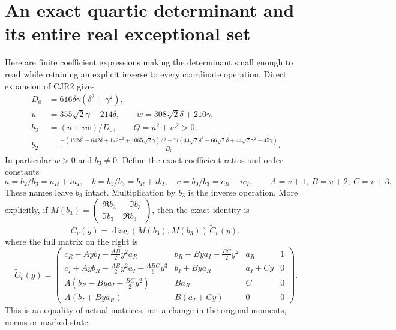 \section{An exact quartic determinant and its entire real exceptional set}
Here are finite coefficient expressions making the determinant small
enough to read while retaining an explicit inverse to every coordinate
operation. Direct expansion of CJR2 gives
\[
 \begin{split}
 D_0&=616\delta\gamma(\delta^2+\gamma^2),\\
 u&=355\sqrt2\gamma-214\delta,
 \qquad w=308\sqrt2\delta+210\gamma,\\
 b_3&=(u+iw)/D_0,\qquad Q=u^2+w^2>0,\\
 b_2&=\frac{-(172\delta^2-642\delta+172\gamma^2+
                   1065\sqrt2\gamma)/2
       +7i(44\sqrt2\delta^2-66\sqrt2\delta+
                    44\sqrt2\gamma^2-45\gamma)}{D_0}.
 \end{split}\tag{CJR6}
\]
In particular $w>0$ and $b_3\ne0$. Define the exact coefficient
ratios and order constants
\[
 a=b_2/b_3=a_R+ia_I,\quad b=b_1/b_3=b_R+ib_I,
 \quad c=b_0/b_3=c_R+ic_I,
 \qquad A=v+1,\ B=v+2,\ C=v+3.
 \tag{CJR7}
\]
These names leave $b_3$ intact. Multiplication by $b_3$ is the
inverse operation. More explicitly, if
$M(b_3)=\left(\begin{smallmatrix}\Re b_3&-\Im b_3\\
\Im b_3&\Re b_3\end{smallmatrix}\right)$, then the exact identity is
\[
 C_v(y)=\operatorname{diag}(M(b_3),M(b_3))\,\widetilde C_v(y),
 \tag{CJR8}
\]
where the full matrix on the right is
\[
\widetilde C_v(y)=
\begin{pmatrix}
 c_R-Ayb_I-\frac{AB}{2}y^2a_R&
 b_R-Bya_I-\frac{BC}{2}y^2&a_R&1\\
 c_I+Ayb_R-\frac{AB}{2}y^2a_I-\frac{ABC}{6}y^3&
 b_I+Bya_R&a_I+Cy&0\\
 A(b_R-Bya_I-\frac{BC}{2}y^2)&Ba_R&C&0\\
 A(b_I+Bya_R)&B(a_I+Cy)&0&0
\end{pmatrix}.
\tag{CJR9}
\]
This is an equality of actual matrices, not a change in the original
moments, norms or marked state.


